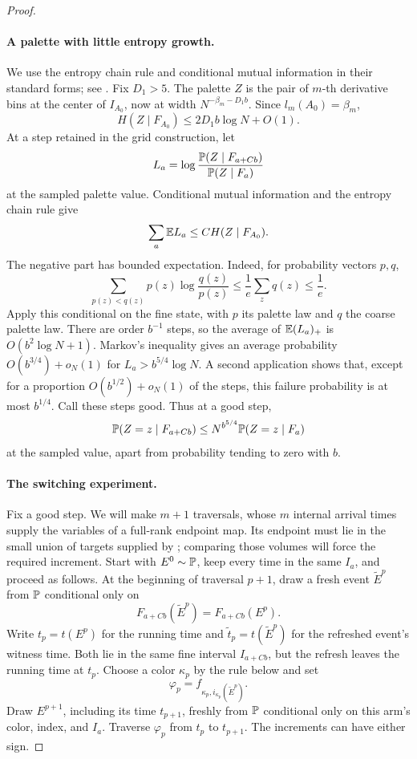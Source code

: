 \begin{proof}
\paragraph{A palette with little entropy growth.}
We use the entropy chain rule and conditional mutual information
in their standard forms; see \citet[Chapter~2]{CoverThomas2006}.
Fix \(D_1>5\).  The palette \(Z\) is the pair of \(m\)-th derivative
bins at the center of \(I_{A_0}\), now at width
\(N^{-\beta_m-D_1b}\).  Since \(l_m(A_0)=\beta_m\),
\[
 H(Z\mid F_{A_0})\le2D_1b\log N+O(1).
\]
At a step retained in the grid construction, let
\[
 L_a=\log\frac{\mathbb P(Z\mid F_{a+Cb})}{\mathbb P(Z\mid F_a)}
\]
at the sampled palette value.  Conditional mutual information and
the entropy chain rule give
\[
 \sum_a \mathbb E L_a\le C H(Z\mid F_{A_0}).
\]
The negative part has bounded expectation.  Indeed, for probability
vectors \(p,q\),
\[
 \sum_{p(z)<q(z)}p(z)\log\frac{q(z)}{p(z)}
 \le \frac1e\sum_zq(z)\le\frac1e.
\]
Apply this conditional on the fine state, with \(p\) its palette law
and \(q\) the coarse palette law.  There are order \(b^{-1}\) steps,
so the average of \(\mathbb E(L_a)_+\) is
\(O(b^2\log N+1)\).  Markov's inequality gives an average probability
\(O(b^{3/4})+o_N(1)\) for
\(L_a>b^{5/4}\log N\).  A second application shows that, except for
a proportion \(O(b^{1/2})+o_N(1)\) of the steps, this failure
probability is at most \(b^{1/4}\).  Call these steps good.  Thus at
a good step,
\begin{equation}
 \mathbb P(Z=z\mid F_{a+Cb})
 \le N^{b^{5/4}}\mathbb P(Z=z\mid F_a)
 \label{a02:palette-likelihood}
\end{equation}
at the sampled value, apart from probability tending to zero with
\(b\).

\paragraph{The switching experiment.}
Fix a good step.  We will make \(m+1\) traversals, whose \(m\)
internal arrival times supply the variables of a full-rank endpoint
map.  Its endpoint must lie in the small union of targets supplied
by ; comparing those volumes will force
the required increment.  Start with \(E^0\sim\mathbb P\), keep every time
in the same \(I_a\), and proceed as follows.  At the beginning of
traversal \(p+1\), draw a fresh event \(\widetilde E^p\) from
\(\mathbb P\) conditional only on
\[
 F_{a+Cb}(\widetilde E^p)=F_{a+Cb}(E^p).
\]
Write \(t_p=t(E^p)\) for the running time and
\(\widetilde t_p=t(\widetilde E^p)\) for the refreshed event's
witness time.  Both lie in the same fine interval
\(I_{a+Cb}\), but the refresh leaves the running time at \(t_p\).
Choose a color \(\kappa_p\) by the rule below and set
\[
 \varphi_p=f_{\kappa_p,i_{\kappa_p}(\widetilde E^p)}.
\]
Draw \(E^{p+1}\), including its time \(t_{p+1}\), freshly from
\(\mathbb P\) conditional only on this arm's color, index, and \(I_a\).
Traverse \(\varphi_p\) from \(t_p\) to \(t_{p+1}\).  The increments
can have either sign.


\end{proof}
